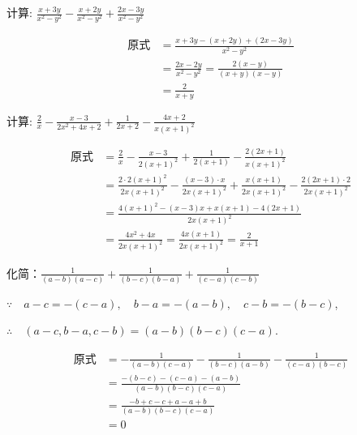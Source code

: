 \begin{example}
    计算: $\frac{x+3 y}{x^{2}-y^{2}}-\frac{x+2 y}{x^{2}-y^{2}}+\frac{2x-3y}{x^2-y^2}$
\end{example}


\begin{solution}
    \[\begin{split}
        \text{原式}&=\frac{x+3y-(x+2y)+(2x-3y)}{x^2-y^2}\\
&=\frac{2x-2y}{x^2-y^2}=\frac{2(x-y)}{(x+y)(x-y)}\\
        &=\frac{2}{x+y}
    \end{split}\]
\end{solution}


\begin{example}
    计算:
$\frac{2}{x}-\frac{x-3}{2 x^{2}+4 x+2}+\frac{1}{2 x+2}-\frac{4 x+2}{x(x+1)^{2}}$
\end{example}

\begin{solution}
\[\begin{split}
    \text{原式}&= \frac{2}{x}-\frac{x-3}{2(x+1)^{2}}+\frac{1}{2(x+1)}-\frac{2(2 x+1)}{x(x+1)^{2}} \\
    &= \frac{2 \cdot 2(x+1)^{2}}{2 x(x+1)^{2}}-\frac{(x-3) \cdot x}{2 x(x+1)^{2}}+\frac{x(x+1)}{2 x(x+1)^{2}}-\frac{2(2 x+1) \cdot 2}{2 x(x+1)^{2}} \\
    &=\frac{4(x+1)^{2}-(x-3) x+x(x+1)-4(2 x+1)}{2 x(x+1)^{2}}\\
&=\frac{4 x^{2}+4 x}{2 x(x+1)^{2}}=\frac{4 x(x+1)}{2 x(x+1)^{2}}=\frac{2}{x+1}
\end{split}\]
\end{solution}

\begin{example}
    化简：$\frac{1}{(a-b)(a-c)}+\frac{1}{(b-c)(b-a)}+\frac{1}{(c-a)(c-b)}$
    \end{example}

\begin{analyze}
    $\because \quad a-c=-(c-a),\quad  b-a=-(a-b),\quad c-b=-(b-c)$,

    $\therefore\quad (a-c,b-a,c-b)=(a-b)(b-c)(c-a)$.
\end{analyze}

\begin{solution}
   \[\begin{split}
    \text{原式}&=-\frac{1}{(a-b)(c-a)}-\frac{1}{(b-c)(a-b)}-\frac{1}{(c-a)(b-c)}\\
    &=\frac{-(b-c)-(c-a)-(a-b)}{(a-b)(b-c)(c-a)}\\
    &=\frac{-b+c-c+a-a+b}{(a-b)(b-c)(c-a)}\\
    &=0     
   \end{split}\] 
\end{solution}

